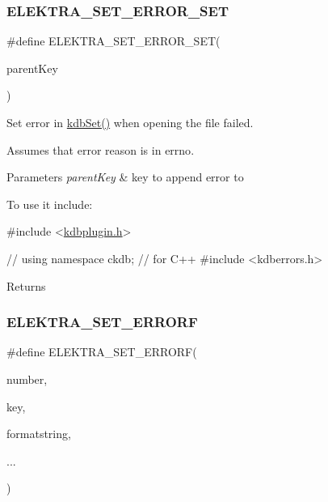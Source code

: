 \subsubsection{\texorpdfstring{E\+L\+E\+K\+T\+R\+A\+\_\+\+S\+E\+T\+\_\+\+E\+R\+R\+O\+R\+\_\+\+S\+ET}{ELEKTRA\_SET\_ERROR\_SET}}
{\footnotesize\ttfamily \#define E\+L\+E\+K\+T\+R\+A\+\_\+\+S\+E\+T\+\_\+\+E\+R\+R\+O\+R\+\_\+\+S\+ET(\begin{DoxyParamCaption}\item[{}]{parent\+Key }\end{DoxyParamCaption})}



Set error in \hyperlink{group__kdb_ga11436b058408f83d303ca5e996832bcf}{kdb\+Set()} when opening the file failed. 

Assumes that error reason is in {\ttfamily errno}.


\begin{DoxyParams}{Parameters}
{\em parent\+Key} & key to append error to\\
\hline
\end{DoxyParams}
To use it include\+:


\begin{DoxyCodeInclude}
\textcolor{preprocessor}{#include <\hyperlink{kdbplugin_8h}{kdbplugin.h}>}
\end{DoxyCodeInclude}

\begin{DoxyCodeInclude}
\textcolor{comment}{// using namespace ckdb; // for C++}
\textcolor{preprocessor}{#include <kdberrors.h>}
\end{DoxyCodeInclude}
 \begin{DoxyReturn}{Returns}

\end{DoxyReturn}
\mbox{\label{group__plugin_ga3e4fc2c20d8e64bed7a54bb1af882e34}} 
\subsubsection{\texorpdfstring{E\+L\+E\+K\+T\+R\+A\+\_\+\+S\+E\+T\+\_\+\+E\+R\+R\+O\+RF}{ELEKTRA\_SET\_ERRORF}}
{\footnotesize\ttfamily \#define E\+L\+E\+K\+T\+R\+A\+\_\+\+S\+E\+T\+\_\+\+E\+R\+R\+O\+RF(\begin{DoxyParamCaption}\item[{}]{number,  }\item[{}]{key,  }\item[{}]{formatstring,  }\item[{}]{... }\end{DoxyParamCaption})}



